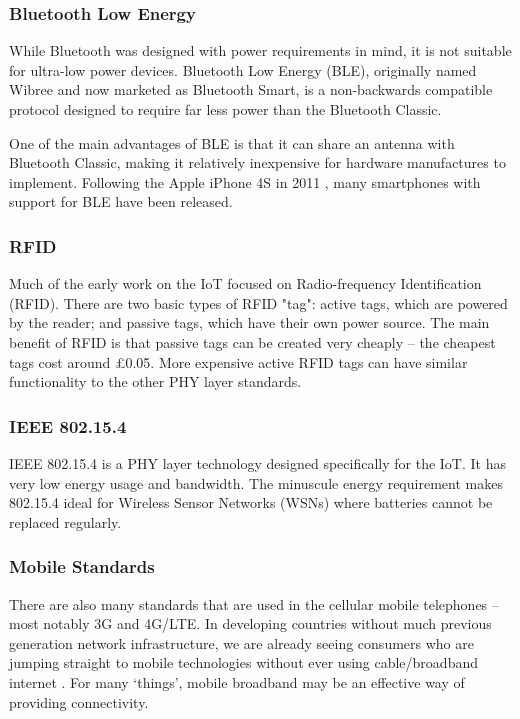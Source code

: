 \documentclass[10pt,journal,compsoc]{IEEEtran}
\begin{document}
\subsubsection{Bluetooth Low Energy}
While Bluetooth was designed with power requirements in mind, it is not
suitable for ultra-low power devices. Bluetooth Low Energy (BLE), originally
named Wibree and now marketed as Bluetooth Smart, is a non-backwards
compatible protocol designed to require far less power than the Bluetooth
Classic. 

One of the main advantages of BLE is that it can share an antenna with
Bluetooth Classic, making it relatively inexpensive for hardware manufactures
to implement.  Following the Apple iPhone 4S in 2011 \cite{Engadget2011}, many
smartphones with support for BLE have been released.

\subsubsection{RFID}
Much of the early work on the IoT focused on Radio-frequency Identification
(RFID). There are two basic types of RFID "tag": active tags, which are powered
by the reader; and passive tags, which have their own power source. The main
benefit of RFID is that passive tags can be created very cheaply -- the
cheapest tags cost around \pounds0.05. More expensive active RFID tags can
have similar functionality to the other PHY layer standards. 

\subsubsection{IEEE 802.15.4}
IEEE 802.15.4 is a PHY layer technology designed specifically for the IoT. It
has very low energy usage and bandwidth. The minuscule energy requirement makes
802.15.4 ideal for Wireless Sensor Networks (WSNs) where batteries cannot be
replaced regularly. 

\subsubsection{Mobile Standards}
There are also many standards that are used in the cellular mobile telephones
-- most notably 3G and 4G/LTE. In developing countries without much previous
generation network infrastructure, we are already seeing consumers who are
jumping straight to mobile technologies without ever using cable/broadband
internet \cite{Kritzinger2013}. For many `things', mobile broadband may be an
effective way of providing connectivity.  
\end{document}

